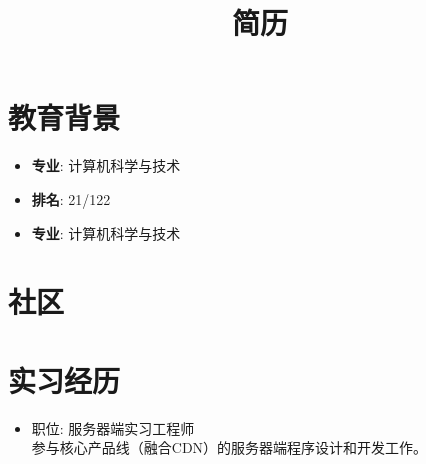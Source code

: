 \documentclass[11pt,a4paper]{moderncv}
\title{简历}               %
\begin{document}
\maketitle

\section{教育背景}
{
\begin{itemize}
\item \textbf{专业}: 计算机科学与技术
\item \textbf{排名}: 21/122
\end{itemize}
}


{
\begin{itemize}
\item \textbf{专业}: 计算机科学与技术
\end{itemize}
}


\section{社区}


\section{实习经历}
{
\begin{itemize}
\item 职位: 服务器端实习工程师\\
参与核心产品线（融合CDN）的服务器端程序设计和开发工作。
\end{itemize}
}
\vspace*{0.4\baselineskip}
\end{document}
